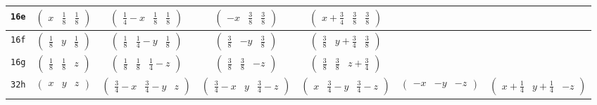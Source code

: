 \documentclass[fleqn,9pt,landscape]{jsarticle}
\begin{document}
\begin{center}
\begin{longtable}{ccccccc}
{\tt 16e} & $ \begin{pmatrix} x & \frac{1}{8} & \frac{1}{8} \end{pmatrix} $ & $ \begin{pmatrix} \frac{1}{4} - x & \frac{1}{8} & \frac{1}{8} \end{pmatrix} $ & $ \begin{pmatrix} - x & \frac{3}{8} & \frac{3}{8} \end{pmatrix} $ & $ \begin{pmatrix} x + \frac{3}{4} & \frac{3}{8} & \frac{3}{8} \end{pmatrix} $ & $  $ & $  $ \\ \hline
{\tt 16f} & $ \begin{pmatrix} \frac{1}{8} & y & \frac{1}{8} \end{pmatrix} $ & $ \begin{pmatrix} \frac{1}{8} & \frac{1}{4} - y & \frac{1}{8} \end{pmatrix} $ & $ \begin{pmatrix} \frac{3}{8} & - y & \frac{3}{8} \end{pmatrix} $ & $ \begin{pmatrix} \frac{3}{8} & y + \frac{3}{4} & \frac{3}{8} \end{pmatrix} $ & $  $ & $  $ \\ \hline
{\tt 16g} & $ \begin{pmatrix} \frac{1}{8} & \frac{1}{8} & z \end{pmatrix} $ & $ \begin{pmatrix} \frac{1}{8} & \frac{1}{8} & \frac{1}{4} - z \end{pmatrix} $ & $ \begin{pmatrix} \frac{3}{8} & \frac{3}{8} & - z \end{pmatrix} $ & $ \begin{pmatrix} \frac{3}{8} & \frac{3}{8} & z + \frac{3}{4} \end{pmatrix} $ & $  $ & $  $ \\ \hline
{\tt 32h} & $ \begin{pmatrix} x & y & z \end{pmatrix} $ & $ \begin{pmatrix} \frac{3}{4} - x & \frac{3}{4} - y & z \end{pmatrix} $ & $ \begin{pmatrix} \frac{3}{4} - x & y & \frac{3}{4} - z \end{pmatrix} $ & $ \begin{pmatrix} x & \frac{3}{4} - y & \frac{3}{4} - z \end{pmatrix} $ & $ \begin{pmatrix} - x & - y & - z \end{pmatrix} $ & $ \begin{pmatrix} x + \frac{1}{4} & y + \frac{1}{4} & - z \end{pmatrix} $ \\

\end{longtable}
\end{center}
\end{document}
